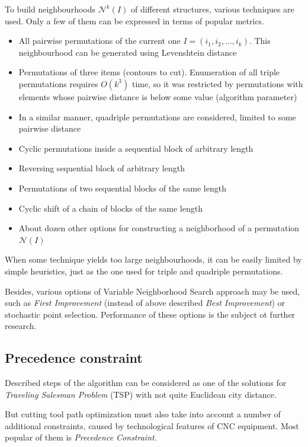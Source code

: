 \documentclass{ifacconf}
\begin{document}
To build neighbourhoods
$\mathcal N^k(I)$
of different structures,
various techniques are used.
Only a few of them
can be expressed in terms of
popular metrics.

\begin{itemize}
\item All pairwise permutations of the current one
$I=(i_1, i_2, \dots, i_k)$.
This neighbourhood can be
generated using Levenshtein distance

\item Permutations of three items (contours to cut).
Enumeration of all triple permutations
requires $O(k^3)$ time,
so it was restricted
by permutations with elements
whose pairwise distance is below
some value
(algorithm parameter)

\item In a similar manner,
quadriple permutations are considered,
limited to some pairwise distance

\item Cyclic permutations inside a sequential block of arbitrary length
\item Reversing sequential block of arbitrary length
\item Permutations of two sequential blocks of the same length
\item Cyclic shift of a chain of blocks of the same length
\item About dozen other options for constructing a neighborhood of a permutation $ \mathcal N (I) $
\end{itemize}

When some technique yields
too large neighbourhoods,
it can be easily limited
by simple heuristics,
just as the one used for
triple and quadriple permutations.

Besides,
various options of
Variable Neighborhood Search approach
may be used,
such as
\textit{First Improvement}
(instead of above described \textit{Best Improvement})
or
stochastic point selection.
Performance of these options
is the subject ot further research.

\subsection{Precedence constraint}

Described steps of the algorithm
can be considered as one of the solutions
for
\textit{Traveling Salesman Problem}
(TSP)
with not quite Euclidean city distance.

But cutting tool path optimization
must also take into account a number of
additional constraints,
caused by technological features
of CNC equipment.
Most popular of them is
\textit{Precedence Constraint}.
\end{document}
